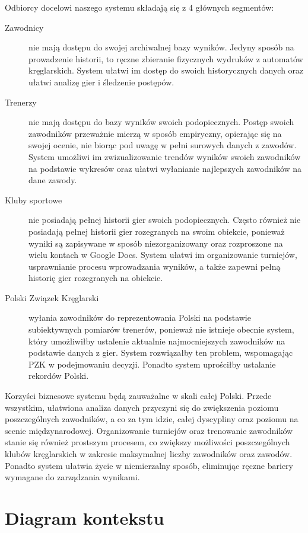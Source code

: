 \documentclass[polish, a4paper]{article}
\begin{document}
Odbiorcy docelowi naszego systemu składają się z 4 głównych segmentów:

\begin{description}
\item[Zawodnicy]{nie mają dostępu do swojej archiwalnej bazy wyników. Jedyny sposób na prowadzenie historii, to ręczne zbieranie fizycznych wydruków z automatów kręglarskich. System ułatwi im dostęp do swoich historycznych danych oraz ułatwi analizę gier i śledzenie postępów.}
\item[Trenerzy]{nie mają dostępu do bazy wyników swoich podopiecznych. Postęp swoich zawodników przeważnie mierzą w sposób empiryczny, opierając się na swojej ocenie, nie biorąc pod uwagę w pełni surowych danych z zawodów. System umożliwi im zwizualizowanie trendów wyników swoich zawodników na podstawie wykresów oraz ułatwi wyłanianie najlepszych zawodników na dane zawody.}
\item[Kluby sportowe]{nie posiadają pełnej historii gier swoich podopiecznych. Często również nie posiadają pełnej historii gier rozegranych na swoim obiekcie, ponieważ wyniki są zapisywane w sposób niezorganizowany oraz rozproszone na wielu kontach w Google Docs. System ułatwi im organizowanie turniejów, usprawnianie procesu wprowadzania wyników, a także zapewni pełną historię gier rozegranych na obiekcie.}
\item[Polski Związek Kręglarski]{wyłania zawodników do reprezentowania Polski na podstawie subiektywnych pomiarów trenerów, ponieważ nie istnieje obecnie system, który umożliwiłby ustalenie aktualnie najmocniejszych zawodników na podstawie danych z gier. System rozwiązałby ten problem, wspomagając PZK w podejmowaniu decyzji. Ponadto system uprościłby ustalanie rekordów Polski.}
\end{description}

Korzyści biznesowe systemu będą zauważalne w skali całej Polski. Przede wszystkim, ułatwiona analiza danych przyczyni się do zwiększenia poziomu poszczególnych zawodników, a co za tym idzie, całej dyscypliny oraz poziomu na scenie międzynarodowej. Organizowanie turniejów oraz trenowanie zawodników stanie się również prostszym procesem, co zwiększy możliwości poszczególnych klubów kręglarskich w zakresie maksymalnej liczby zawodników oraz zawodów. Ponadto system ułatwia życie w niemierzalny sposób, eliminując ręczne bariery wymagane do zarządzania wynikami. 

\section{Diagram kontekstu}
\end{document}
